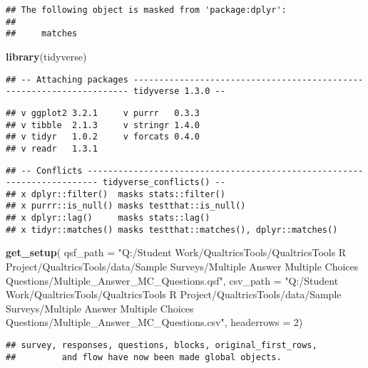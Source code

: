 \documentclass[
]{article}
\newenvironment{Shaded}{\begin{snugshade}}{\end{snugshade}}
\newcommand{\DataTypeTok}[1]{\textcolor[rgb]{0.13,0.29,0.53}{#1}}
\newcommand{\DecValTok}[1]{\textcolor[rgb]{0.00,0.00,0.81}{#1}}
\newcommand{\KeywordTok}[1]{\textcolor[rgb]{0.13,0.29,0.53}{\textbf{#1}}}
\newcommand{\NormalTok}[1]{#1}
\newcommand{\StringTok}[1]{\textcolor[rgb]{0.31,0.60,0.02}{#1}}
\begin{document}
\begin{verbatim}
## The following object is masked from 'package:dplyr':
## 
##     matches
\end{verbatim}

\begin{Shaded}
\begin{Highlighting}[]
\KeywordTok{library}\NormalTok{(tidyverse)}
\end{Highlighting}
\end{Shaded}

\begin{verbatim}
## -- Attaching packages --------------------------------------------------------------------- tidyverse 1.3.0 --
\end{verbatim}

\begin{verbatim}
## v ggplot2 3.2.1     v purrr   0.3.3
## v tibble  2.1.3     v stringr 1.4.0
## v tidyr   1.0.2     v forcats 0.4.0
## v readr   1.3.1
\end{verbatim}

\begin{verbatim}
## -- Conflicts ------------------------------------------------------------------------ tidyverse_conflicts() --
## x dplyr::filter()  masks stats::filter()
## x purrr::is_null() masks testthat::is_null()
## x dplyr::lag()     masks stats::lag()
## x tidyr::matches() masks testthat::matches(), dplyr::matches()
\end{verbatim}

\begin{Shaded}
\begin{Highlighting}[]
\KeywordTok{get_setup}\NormalTok{(}
      \DataTypeTok{qsf_path =} \StringTok{"Q:/Student Work/QualtricsTools/QualtricsTools R Project/QualtricsTools/data/Sample Surveys/Multiple Answer Multiple Choices Questions/Multiple_Answer_MC_Questions.qsf"}\NormalTok{,}
      \DataTypeTok{csv_path =} \StringTok{"Q:/Student Work/QualtricsTools/QualtricsTools R Project/QualtricsTools/data/Sample Surveys/Multiple Answer Multiple Choices Questions/Multiple_Answer_MC_Questions.csv"}\NormalTok{,}
      \DataTypeTok{headerrows =} \DecValTok{2}\NormalTok{)}
\end{Highlighting}
\end{Shaded}

\begin{verbatim}
## survey, responses, questions, blocks, original_first_rows,
##         and flow have now been made global objects.
\end{verbatim}
\end{document}

